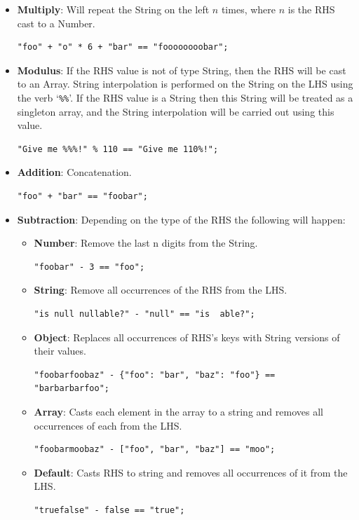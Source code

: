 \documentclass[]{full}
\theoremstyle{definition}
\begin{document}
\begin{itemize}
    \item \textbf{Multiply}: Will repeat the String on the left $n$ times, where $n$ is the RHS cast to a Number.
    \begin{verbatim}
"foo" + "o" * 6 + "bar" == "foooooooobar";
    \end{verbatim}
    \item \textbf{Modulus}: If the RHS value is not of type String, then the RHS will be cast to an Array. String interpolation is performed on the String on the LHS using the verb `\verb|%%|'. If the RHS value is a String then this String will be treated as a singleton array, and the String interpolation will be carried out using this value.
    \begin{verbatim}
"Give me %%%!" % 110 == "Give me 110%!";
    \end{verbatim}
    \item \textbf{Addition}: Concatenation.
    \begin{verbatim}
"foo" + "bar" == "foobar";
    \end{verbatim}
    \item \textbf{Subtraction}: Depending on the type of the RHS the following will happen:
    \begin{itemize}
        \item \textbf{Number}:  Remove the last n digits from the String.
        \begin{verbatim}
"foobar" - 3 == "foo";
        \end{verbatim}
        \item \textbf{String}:  Remove all occurrences of the RHS from the LHS.
        \begin{verbatim}
"is null nullable?" - "null" == "is  able?";
        \end{verbatim}
        \item \textbf{Object}:  Replaces all occurrences of RHS's keys with String versions of their values.
        \begin{verbatim}
"foobarfoobaz" - {"foo": "bar", "baz": "foo"} == "barbarbarfoo";
        \end{verbatim}
        \item \textbf{Array}:   Casts each element in the array to a string and removes all occurrences of each from the LHS.
        \begin{verbatim}
"foobarmoobaz" - ["foo", "bar", "baz"] == "moo";
        \end{verbatim}
        \item \textbf{Default}: Casts RHS to string and removes all occurrences of it from the LHS.
        \begin{verbatim}
"truefalse" - false == "true";
        \end{verbatim}
    \end{itemize}
\end{itemize}
\end{document}
